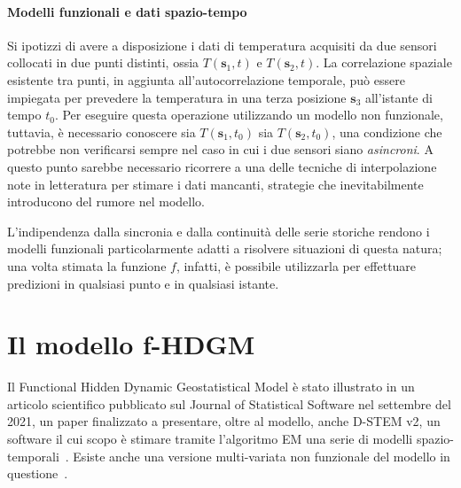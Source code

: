 \paragraph[Modelli funzionali e dati spazio-tempo]{Modelli funzionali e dati spazio-tempo}
Si ipotizzi di avere a disposizione i dati di temperatura acquisiti da due sensori collocati in due punti distinti, ossia $T(\mathbf{s}_1, t)$ e $T(\mathbf{s}_2, t)$. La correlazione spaziale esistente tra punti, in aggiunta all'autocorrelazione temporale, può essere impiegata per prevedere la temperatura in una terza posizione $\mathbf{s}_3$ all'istante di tempo $t_0$. Per eseguire questa operazione utilizzando un modello non funzionale, tuttavia, è necessario conoscere sia $T(\mathbf{s}_1, t_0)$ sia $T(\mathbf{s}_2, t_0)$, una condizione che potrebbe non verificarsi sempre nel caso in cui i due sensori siano \textit{asincroni}. A questo punto sarebbe necessario ricorrere a una delle tecniche di interpolazione note in letteratura per stimare i dati mancanti, strategie che inevitabilmente introducono del rumore nel modello. \par L'indipendenza dalla sincronia e dalla continuità delle serie storiche rendono i modelli funzionali particolarmente adatti a risolvere situazioni di questa natura; una volta stimata la funzione $f$, infatti, è possibile utilizzarla per effettuare predizioni in qualsiasi punto e in qualsiasi istante.

\section[Il modello f-HDGM]{Il modello f-HDGM}
Il Functional Hidden Dynamic Geostatistical Model è stato illustrato in un articolo scientifico pubblicato sul Journal of Statistical Software nel settembre del \num{2021}, un paper finalizzato a presentare, oltre al modello, anche D-STEM v2, un software il cui scopo è stimare tramite l'algoritmo EM una serie di modelli spazio-temporali~\citep{paper_f_HDGM}. Esiste anche una versione multi-variata non funzionale del modello in questione~\citep{paper_HDGM}.

